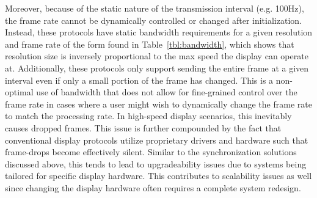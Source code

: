     Moreover, because of the static nature of the transmission interval (e.g. 100Hz), the frame rate cannot be dynamically controlled or changed after initialization. Instead, these protocols have static bandwidth requirements for a given resolution and frame rate of the form found in Table~\ref{tbl:bandwidth}, which shows that resolution size is inversely proportional to the max speed the display can operate at. Additionally, these protocols only support sending the entire frame at a given interval even if only a small portion of the frame has changed. This is a non-optimal use of bandwidth that does not allow for fine-grained control over the frame rate in cases where a user might wish to dynamically change the frame rate to match the processing rate. In high-speed display scenarios, this inevitably causes dropped frames. This issue is further compounded by the fact that conventional display protocols utilize proprietary drivers and hardware such that frame-drops become effectively silent. Similar to the synchronization solutions discussed above, this tends to lead to upgradeability issues due to systems being tailored for specific display hardware. This contributes to scalability issues as well since changing the display hardware often requires a complete system redesign.


